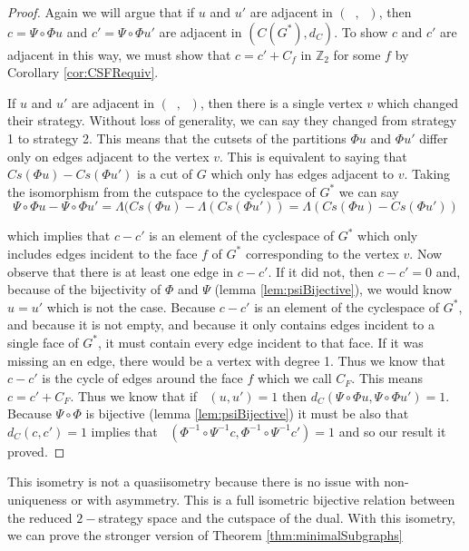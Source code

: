 \documentclass{article}
\DeclareMathOperator{\At}{\mathcal{A}_{G}^{(2)}}
\DeclareMathOperator{\dAt}{d_{\mathcal{A}}^{(2)}}
\begin{document}
    \begin{proof}
        Again we will argue that if $u$ and $u'$ are adjacent in $(\At,\dAt)$, then $c=\Psi\circ\Phi u$ and $c'=\Psi \circ \Phi u'$ are adjacent in $(C(G^*),d_C)$. To show $c$ and $c'$ are adjacent in this way, we must show that $c=c'+C_f$ in $\mathbb{Z}_2$ for some $f$ by Corollary \ref{cor:CSFRequiv}.
        
        If $u$ and $u'$ are adjacent in $(\At,\dAt)$, then there is a single vertex $v$ which changed their strategy. Without loss of generality, we can say they changed from strategy 1 to strategy 2. This means that the cutsets of the partitions $\Phi u$ and $\Phi u'$ differ only on edges adjacent to the vertex $v$.
        This is equivalent to saying that $Cs(\Phi u)-Cs(\Phi u')$ is a cut of $G$ which only has edges adjacent to $v$. Taking the isomorphism from the cutspace to the cyclespace of $G^*$ we can say 
        \[\Psi \circ \Phi u-\Psi \circ \Phi u'=\Lambda (Cs(\Phi u)-\Lambda (Cs(\Phi u'))=\Lambda (Cs(\Phi u)-Cs(\Phi u')) \]
        
        which implies that $c-c'$ is an element of the cyclespace of $G^*$ which only includes edges incident to the face $f$ of $G^*$ corresponding to the vertex $v$. Now observe that there is at least one edge in $c-c'$. If it did not, then $c-c'=0$ and, because of the bijectivity of $\Phi$ and $\Psi$ (lemma \ref{lem:psiBijective}), we would know $u=u'$ which is not the case. Because $c-c'$ is an element of the cyclespace of $G^*$, and because it is not empty, and because it only contains edges incident to a single face of $G^*$, it must contain every edge incident to that face. If it was missing an en edge, there would be a vertex with degree 1. Thus we know that $c-c'$ is the cycle of edges around the face $f$ which we call $C_F$. This means $c=c'+C_F$. Thus we know that if $\dAt(u,u')= 1$ then $d_C(\Psi\circ\Phi u ,\Psi\circ\Phi u')= 1$. 
        Because $\Psi \circ \Phi$ is bijective (lemma \ref{lem:psiBijective}) it must be also that $d_C(c,c')=1$ implies that $\dAt(\Phi^{-1}\circ\Psi^{-1} c,\Phi^{-1}\circ\Psi^{-1} c')=1$ and so our result it proved.
    \end{proof}

    This isometry is not a quasiisometry because there is no issue with non-uniqueness or with asymmetry. This is a full isometric bijective relation between the reduced $2-$strategy space and the cutspace of the dual. With this isometry, we can prove the stronger version of Theorem \ref{thm:minimalSubgraphs}
\end{document}
